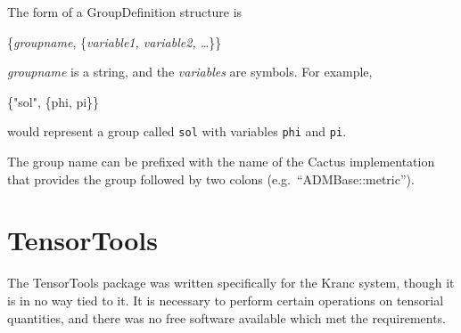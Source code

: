 \documentclass{report}
\begin{document}
The form of a GroupDefinition structure is
\begin{center}
\begin{minipage}{0.8 \textwidth}
\begin{tt}
\{{\it groupname}, \{{\it variable1, variable2, \ldots}\}\}
\end{tt}
\end{minipage}
\end{center}
{\it groupname} is a string, and the {\it variables} are symbols.  For
example,
\begin{center}
\begin{minipage}{0.8 \textwidth}
\begin{tt}
\{"sol", \{phi, pi\}\}
\end{tt}
\end{minipage}
\end{center}
would represent a group called {\tt sol} with variables {\tt phi} and
{\tt pi}.

The group name can be prefixed with the name of the Cactus
implementation that provides the group followed by two colons
(e.g.~``ADMBase::metric'').


\section{TensorTools}

The TensorTools package was written specifically for the Kranc system,
though it is in no way tied to it.  It is necessary to perform certain
operations on tensorial quantities, and there was no free software
available which met the requirements.


\end{document}
